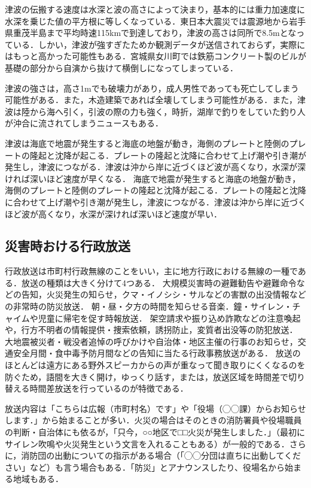 \documentclass[a4j,11pt]{jsarticle}
\begin{document}
津波の伝搬する速度は水深と波の高さによって決まり，基本的には重力加速度に水深を乗じた値の平方根に等しくなっている．東日本大震災では震源地から岩手県重茂半島まで平均時速115kmで到達しており，津波の高さは同所で8.5mとなっている．しかい，津波が強すぎたためか観測データが送信されておらず，実際にはもっと高かった可能性もある．宮城県女川町では鉄筋コンクリート製のビルが基礎の部分から自演から抜けて横倒しになってしまっている．

津波の強さは，高さ1mでも破壊力があり，成人男性であっても死亡してしまう可能性がある．また，木造建築であれば全壊してしまう可能性がある．また，津波は陸から海へ引く，引波の際の力も強く，時折，湖岸で釣りをしていた釣り人が沖合に流されてしまうニュースもある．

津波は海底で地震が発生すると海底の地盤が動き，海側のプレートと陸側のプレートの隆起と沈降が起こる．プレートの隆起と沈降に合わせて上げ潮や引き潮が発生し，津波につながる．津波は沖から岸に近づくほど波が高くなり，水深が深ければ深いほど速度が早くなる．
海底で地震が発生すると海底の地盤が動き，海側のプレートと陸側のプレートの隆起と沈降が起こる．プレートの隆起と沈降に合わせて上げ潮や引き潮が発生し，津波につながる．津波は沖から岸に近づくほど波が高くなり，水深が深ければ深いほど速度が早い．
\subsection{災害時おける行政放送}
行政放送は市町村行政無線のことをいい，主に地方行政における無線の一種である．放送の種類は大きく分けて4つある．
大規模災害時の避難勧告や避難命令などの告知，火災発生の知らせ，クマ・イノシシ・サルなどの害獣の出没情報などの非常時の防災放送．
朝・昼・夕方の時間を知らせる音楽．鐘・サイレン・チャイムや児童に帰宅を促す時報放送．
架空請求や振り込め詐欺などの注意喚起や，行方不明者の情報提供・捜索依頼，誘拐防止，変質者出没等の防犯放送．
大地震被災者・戦没者追悼の呼びかけや自治体・地区主催の行事のお知らせ，交通安全月間・食中毒予防月間などの告知に当たる行政事務放送がある．
放送のほとんどは遠方にある野外スピーカからの声が重なって聞き取りにくくなるのを防ぐため，語間を大きく開け，ゆっくり話す，または，放送区域を時間差で切り替える時間差放送を行っているのが特徴である．

放送内容は「こちらは広報（市町村名）です」や「役場（◯◯課）からお知らせします．」から始まることが多い．火災の場合はそのときの消防署員や役場職員の判断・自治体にも依るが，「只今，○○地区で□□火災が発生しました．」（最初にサイレン吹鳴や火災発生という文言を入れることもある）が一般的である．さらに，消防団の出動についての指示がある場合（「◯◯分団は直ちに出動してください」など）も言う場合もある．「防災」とアナウンスしたり、役場名から始まる地域もある．
\end{document}
